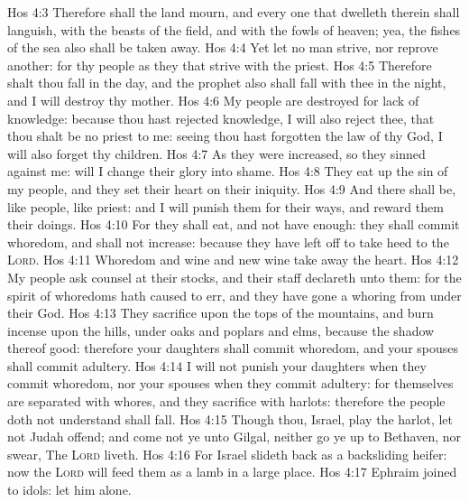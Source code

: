 \vs Hos 4:3 Therefore shall the land mourn, and every one that dwelleth therein shall languish, with the beasts of the field, and with the fowls of heaven; yea, the fishes of the sea also shall be taken away.
\vs Hos 4:4 Yet let no man strive, nor reprove another: for thy people  as they that strive with the priest.
\vs Hos 4:5 Therefore shalt thou fall in the day, and the prophet also shall fall with thee in the night, and I will destroy thy mother.
\vs Hos 4:6 My people are destroyed for lack of knowledge: because thou hast rejected knowledge, I will also reject thee, that thou shalt be no priest to me: seeing thou hast forgotten the law of thy God, I will also forget thy children.
\vs Hos 4:7 As they were increased, so they sinned against me:  will I change their glory into shame.
\vs Hos 4:8 They eat up the sin of my people, and they set their heart on their iniquity.
\vs Hos 4:9 And there shall be, like people, like priest: and I will punish them for their ways, and reward them their doings.
\vs Hos 4:10 For they shall eat, and not have enough: they shall commit whoredom, and shall not increase: because they have left off to take heed to the \textsc{Lord}.
\vs Hos 4:11 Whoredom and wine and new wine take away the heart.
\vs Hos 4:12 My people ask counsel at their stocks, and their staff declareth unto them: for the spirit of whoredoms hath caused  to err, and they have gone a whoring from under their God.
\vs Hos 4:13 They sacrifice upon the tops of the mountains, and burn incense upon the hills, under oaks and poplars and elms, because the shadow thereof  good: therefore your daughters shall commit whoredom, and your spouses shall commit adultery.
\vs Hos 4:14 I will not punish your daughters when they commit whoredom, nor your spouses when they commit adultery: for themselves are separated with whores, and they sacrifice with harlots: therefore the people  doth not understand shall fall.
\vs Hos 4:15 Though thou, Israel, play the harlot,  let not Judah offend; and come not ye unto Gilgal, neither go ye up to Bethaven, nor swear, The \textsc{Lord} liveth.
\vs Hos 4:16 For Israel slideth back as a backsliding heifer: now the \textsc{Lord} will feed them as a lamb in a large place.
\vs Hos 4:17 Ephraim  joined to idols: let him alone.
